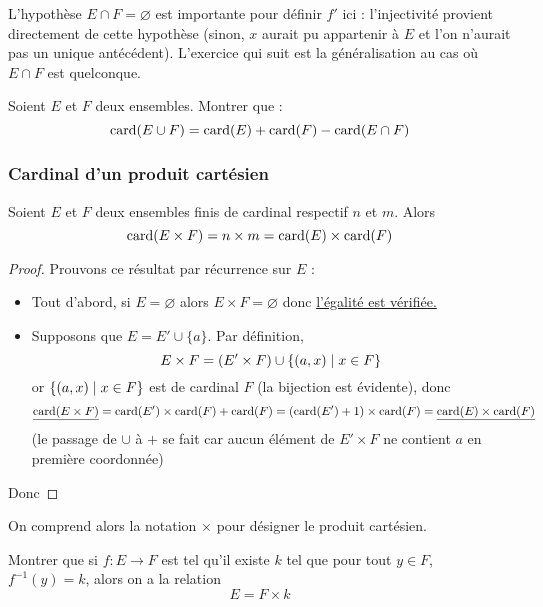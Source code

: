 L'hypothèse $E\cap F = \varnothing$ est importante pour définir $f'$ ici : l'injectivité provient directement de cette hypothèse (sinon, $x$ aurait pu appartenir à $E$ et l'on n'aurait pas un unique antécédent). L'exercice qui suit est la généralisation au cas où $E\cap F$ est quelconque.

\begin{exo}
    Soient $E$ et $F$ deux ensembles. Montrer que : $$\mathrm{card}(E\cup F)=\mathrm{card}(E) + \mathrm{card}(F) - \mathrm{card}(E\cap F)$$
\end{exo}

\subsubsection{Cardinal d'un produit cartésien}

\begin{prop}
    Soient $E$ et $F$ deux ensembles finis de cardinal respectif $n$ et $m$. Alors $$\mathrm{card}(E\times F)=n\times m=\mathrm{card}(E) \times \mathrm{card}(F)$$
\end{prop}

\begin{proof}
    Prouvons ce résultat par récurrence sur $E$ :
    \begin{itemize}[label=$\bullet$]
        \item Tout d'abord, si $E=\varnothing$ alors $E\times F=\varnothing$ donc \underline{l'égalité est vérifiée.}
        \item Supposons que $E=E'\cup \{a\}$. Par définition, $$E\times F=(E'\times F) \cup \{(a,x)\;|\;x\in F\}$$ or $\{(a,x)\;|\;x\in F\}$ est de cardinal $F$ (la bijection est évidente), donc $$\underline{\mathrm{card}(E\times F)} = \mathrm{card}(E')\times\mathrm{card}(F) + \mathrm{card}(F) = (\mathrm{card}(E') +1)\times\mathrm{card}(F) = \underline{\mathrm{card}(E) \times \mathrm{card}(F)}$$ (le passage de $\cup$ à $+$ se fait car aucun élément de $E'\times F$ ne contient $a$ en première coordonnée)
    \end{itemize}
    Donc 
\end{proof}

\begin{rmk}
    On comprend alors la notation $\times$ pour désigner le produit cartésien.
\end{rmk}

\begin{exo}
    Montrer que si $f : E \to F$ est tel qu'il existe $k$ tel que pour tout $y\in F$, $f^{-1}(y)=k$, alors on a la relation $$E=F\times k$$
\end{exo}

